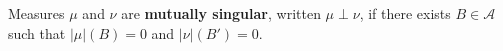 Measures $\mu$ and $\nu$ are \textbf{mutually singular}, written $\mu \perp \nu$, if there exists $B \in \mathcal{A}$ such that $|\mu|(B) = 0$ and $|\nu|(B') = 0$.
